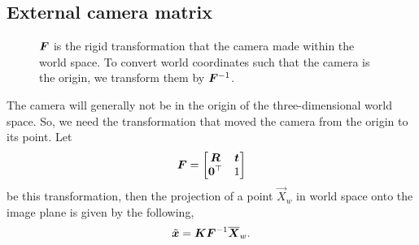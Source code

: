 \subsection{External camera matrix}

\begin{figure}[ht]
    \centering
    \caption{$\bm{F}$ is the rigid transformation that the camera made within
    the world space. To convert world coordinates such that the camera is the
    origin, we transform them by $\bm{F}^{-1}$.}
    \label{fig:pinhole-in-space}
\end{figure}

The camera will generally not be in the origin of the three-dimensional world
space. So, we need the transformation that moved the camera from the origin
to its point. Let \[
  \bm{F}=\begin{bmatrix} \bm{R} & \bm{t} \\ \bm{0}^\top & 1 \end{bmatrix}
\]
be this transformation, then the projection of a point $\vec{X}_w$ in
world space onto the image plane is given by the following, \[
  \tilde{\bm{x}} = \bm{K}\bm{F}^{-1}\overline{\bm{X}}_w
.\]
